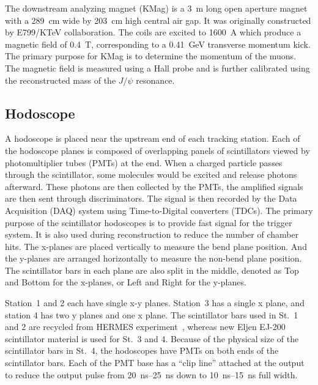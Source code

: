 \documentclass[../main.tex]{subfiles}
\begin{document}
The downstream analyzing magnet (KMag) is a \SI{3}{\meter} long open aperture magnet
with a \SI{289}{\cm} wide by \SI{203}{\cm} high central air gap. It was
originally  constructed by E799/KTeV collaboration\cite{alavi-harati2003}.
The coils are excited to \SI{1600}{\ampere} which produce a magnetic field of \SI{0.4}{\tesla},
corresponding to a \SI{0.41}{\GeV} transverse momentum kick. The primary purpose for
KMag is to determine the momentum of the muons. The magnetic field is measured using a Hall
probe and is further calibrated using the reconstructed mass of the $J/\psi$ resonance.


\subsection{Hodoscope}
A hodoscope is placed near the upstream end of each tracking station. Each of the hodoscope planes
is composed of overlapping panels of scintillators viewed by photomultiplier tubes (PMTs) at the end.
When a charged particle passes through the scintillator, some molecules would be excited and
release photons afterward. These photons are then collected by the PMTs, the amplified signals are
then sent through discriminators. The signal is then recorded by the Data Acquisition (DAQ) system
using Time-to-Digital converters (TDCs).
The primary purpose of the scintillator hodoscopes is to provide fast signal for the
trigger system. It is also used during reconstruction to reduce the number of chamber hits.
The x-planes are placed vertically to measure the bend plane position.
And the y-planes are arranged horizontally to measure the non-bend plane position.
The scintillator bars in each plane are also split in the middle, denoted as Top and Bottom
for the x-planes, or Left and Right for the y-planes.

Station~1 and 2 each have single x-y planes. Station~3 has a single x plane, and station
4 has two y planes and one x plane. The scintillator bars used in St.~1 and 2 are recycled
from HERMES experiment~\cite{ackerstaff1998a}, whereas new Eljen EJ-200 scintillator material
is used for St.~3 and 4. Because of the physical size of the scintillator bars in St.~4, the
hodoscopes have PMTs on both ends of the scintillator bars. Each of the PMT base has a
``clip line'' attached at the output to reduce the output pulse from \SIrange{20}{25}{\ns}
down to \SIrange{10}{15}{\ns} full width.
\end{document}
